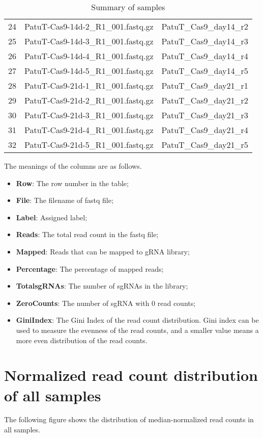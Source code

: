 \documentclass{article}
\begin{document}
\begin{table}[ht]
\begin{tabular}{cp{9cm}c}
  24 & PatuT-Cas9-14d-2\_R1\_001.fastq.gz & PatuT\_Cas9\_day14\_r2 \\ 
  25 & PatuT-Cas9-14d-3\_R1\_001.fastq.gz & PatuT\_Cas9\_day14\_r3 \\ 
  26 & PatuT-Cas9-14d-4\_R1\_001.fastq.gz & PatuT\_Cas9\_day14\_r4 \\ 
  27 & PatuT-Cas9-14d-5\_R1\_001.fastq.gz & PatuT\_Cas9\_day14\_r5 \\ 
  28 & PatuT-Cas9-21d-1\_R1\_001.fastq.gz & PatuT\_Cas9\_day21\_r1 \\ 
  29 & PatuT-Cas9-21d-2\_R1\_001.fastq.gz & PatuT\_Cas9\_day21\_r2 \\ 
  30 & PatuT-Cas9-21d-3\_R1\_001.fastq.gz & PatuT\_Cas9\_day21\_r3 \\ 
  31 & PatuT-Cas9-21d-4\_R1\_001.fastq.gz & PatuT\_Cas9\_day21\_r4 \\ 
  32 & PatuT-Cas9-21d-5\_R1\_001.fastq.gz & PatuT\_Cas9\_day21\_r5 \\ 
   \hline
\end{tabular}
\caption{Summary of samples} 
\label{tab:three}
\end{table}



The meanings of the columns are as follows.

\begin{itemize}
\item \textbf{Row}: The row number in the table;
\item \textbf{File}: The filename of fastq file;
\item \textbf{Label}: Assigned label;
\item \textbf{Reads}: The total read count in the fastq file;
\item \textbf{Mapped}: Reads that can be mapped to gRNA library;
\item \textbf{Percentage}: The percentage of mapped reads;
\item \textbf{TotalsgRNAs}: The number of sgRNAs in the library; 
\item \textbf{ZeroCounts}: The number of sgRNA with 0 read counts;
\item \textbf{GiniIndex}: The Gini Index of the read count distribution. Gini index can be used to measure the evenness of the read counts, and a smaller value means a more even distribution of the read counts.
\end{itemize}



\newpage\section{Normalized read count distribution of all samples}
The following figure shows the distribution of median-normalized read counts in all samples.
\end{document}
